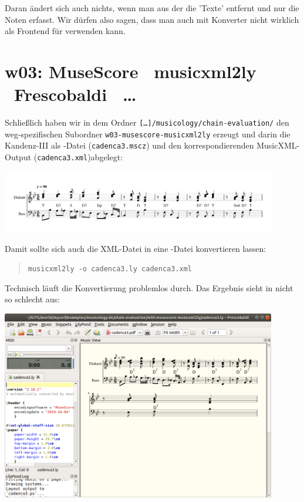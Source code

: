 Daran ändert sich auch nichts, wenn man aus der  die 'Texte'
entfernt und nur die Noten erfasst. Wir dürfen also sagen, dass man
 auch mit Konverter nicht wirklich als Frontend für 
verwenden kann.

\section{w03: Muse\-Score \ra\ musicxml2ly \ra\ Frescobaldi \ra\ \ldots}\label{w03}

Schließlich haben wir in dem Ordner
\texttt{[\ldots]/musicology/chain-evaluation/} den weg-spezifischen Subordner
\texttt{w03-musescore-musicxml2ly} erzeugt und darin die Kandenz-III als
-Datei (\texttt{cadenca3.mscz}) und den korrespondierenden
MusicXML-Output (\texttt{cadenca3.xml})abgelegt:

\begin{center}
\includegraphics[width=0.9\textwidth]{frontends/musescore/cadenca3-musescore-300dpi.png}
\end{center}

Damit sollte sich auch die XML-Datei in eine -Datei konvertieren lassen:

\begin{quote}\texttt{musicxml2ly -o cadenca3.ly cadenca3.xml}\end{quote}

Technisch läuft die Konvertierung problemlos durch. Das Ergebnis sieht in
 nicht so schlecht aus:


\begin{center}
\includegraphics[width=0.9\textwidth]{frontends/musescore/musescore-cadenca3-in-frescobaldi.png}
\end{center}

